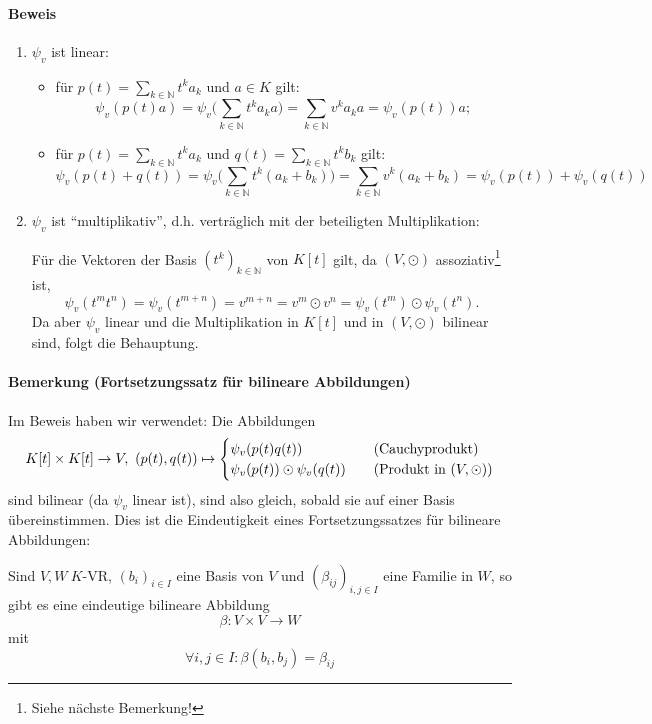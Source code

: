 \paragraph{Beweis}
	\begin{enumerate}
		\item $ \psi_v $ ist linear:
			\begin{itemize}
				\item für $ p(t) = \sum_{k\in\mathbb{N}} t^ka_k $ und $ a\in K $ gilt:
					\[ \psi_v(p(t)a) = \psi_v\Big(\sum_{k\in\mathbb{N}} t^ka_ka\Big) = \sum_{k\in\mathbb{N}} v^ka_ka = \psi_v(p(t))a; \]
				\item für $ p(t) = \sum_{k\in\mathbb{N}} t^ka_k $ und $ q(t) = \sum_{k\in\mathbb{N}} t^k b_k $ gilt:
					\[ \psi_v(p(t)+q(t)) = \psi_v\Big(\sum_{k\in\mathbb{N}}t^k(a_k+b_k)\Big) = \sum_{k\in\mathbb{N}} v^k(a_k+b_k) = \psi_v(p(t))+\psi_v(q(t)) \]
			\end{itemize}
		\item $ \psi_v $ ist "`multiplikativ"', d.h. verträglich mit der beteiligten Multiplikation:
		
			Für die Vektoren der Basis $ (t^k)_{k\in\mathbb{N}} $ von $ K[t] $ gilt, da $ (V,\odot) $ assoziativ\footnote{Siehe nächste Bemerkung!} ist,
				\[ \psi_v(t^mt^n) = \psi_v(t^{m+n}) = v^{m+n} = v^m\odot v^n = \psi_v(t^m)\odot \psi_v(t^n). \]
			Da aber $ \psi_v $ linear und die Multiplikation in $ K[t] $ und in $ (V,\odot) $ bilinear sind, folgt die Behauptung.
	\end{enumerate}
\paragraph{Bemerkung (Fortsetzungssatz für bilineare Abbildungen)}
	Im Beweis haben wir verwendet: Die Abbildungen
		\[ K[t]\times K[t]\to V,\ (p(t),q(t))\mapsto
			\begin{cases}
				\psi_v(p(t)q(t))               & \quad\text{(Cauchyprodukt)}       \\
				\psi_v(p(t))\odot \psi_v(q(t)) & \quad\text{(Produkt in $ (V,\odot) $)}
			\end{cases}
		\]
	sind bilinear (da $ \psi_v $ linear ist), sind also gleich, sobald sie auf einer Basis übereinstimmen.
	Dies ist die Eindeutigkeit eines Fortsetzungssatzes für bilineare Abbildungen:
	
	\begin{Satz}
	Sind $ V,W\ K$-VR, $ (b_i)_{i\in I} $ eine Basis von $ V $ und $ (\beta_{ij})_{i,j\in I} $ eine Familie in $ W $, so gibt es eine eindeutige bilineare Abbildung
		\[ \beta: V\times V\to W \]
	mit
		\[ \forall i,j\in I: \beta(b_i,b_j) = \beta_{ij} \]
	\end{Satz}
	
